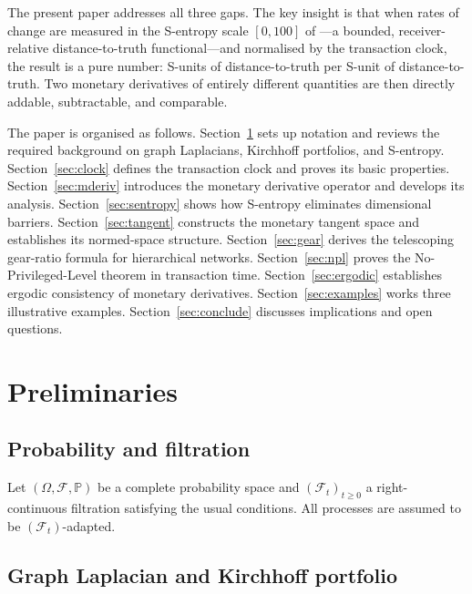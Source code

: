 \documentclass[twocolumn,11pt,a4paper]{article}
\theoremstyle{thmstyle}
\theoremstyle{definition}
\theoremstyle{remark}
\newcommand{\Prob}{\mathbb{P}}
\newcommand{\Filtr}{\mathcal{F}}
\begin{document}
The present paper addresses all three gaps.  The key
insight is that when rates of change are measured in the
S-entropy scale $[0,100]$ of
\citet{Sachikonye2024S}---a bounded, receiver-relative
distance-to-truth functional---and normalised by the
transaction clock, the result is a pure number: S-units of
distance-to-truth per S-unit of distance-to-truth.
Two monetary derivatives of entirely different quantities
are then directly addable, subtractable, and comparable.

The paper is organised as follows.  Section~\ref{sec:prelim}
sets up notation and reviews the required background on
graph Laplacians, Kirchhoff portfolios, and S-entropy.
Section~\ref{sec:clock} defines the transaction clock and
proves its basic properties.  Section~\ref{sec:mderiv}
introduces the monetary derivative operator and develops
its analysis.  Section~\ref{sec:sentropy} shows how
S-entropy eliminates dimensional barriers.
Section~\ref{sec:tangent} constructs the monetary tangent
space and establishes its normed-space structure.
Section~\ref{sec:gear} derives the telescoping gear-ratio
formula for hierarchical networks.  Section~\ref{sec:npl}
proves the No-Privileged-Level theorem in transaction time.
Section~\ref{sec:ergodic} establishes ergodic consistency
of monetary derivatives.  Section~\ref{sec:examples}
works three illustrative examples.  Section~\ref{sec:conclude}
discusses implications and open questions.


\section{Preliminaries}
\label{sec:prelim}

\subsection{Probability and filtration}

Let $(\Omega,\Filtr,\Prob)$ be a complete probability space
and $(\Filtr_{t})_{t\geq 0}$ a right-continuous filtration
satisfying the usual conditions.  All processes are assumed
to be $(\Filtr_{t})$-adapted.

\subsection{Graph Laplacian and Kirchhoff portfolio}
\end{document}

